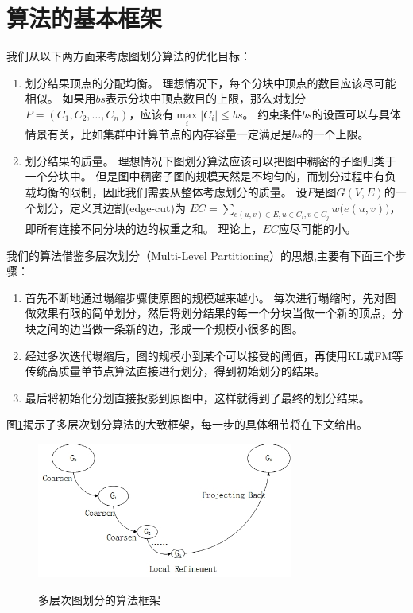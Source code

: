 \documentclass[master]{njuthesis}
\begin{document}
\section{算法的基本框架}
我们从以下两方面来考虑图划分算法的优化目标：
\begin{enumerate}
 \item 划分结果顶点的分配均衡。 理想情况下，每个分块中顶点的数目应该尽可能相似。 
 如果用$bs$表示分块中顶点数目的上限，那么对划分$P=(C_1, C_2, \dots, C_n)$，应该有$\max\limits_{i}|C_i| \leq bs$。
约束条件$bs$的设置可以与具体情景有关，比如集群中计算节点的内存容量一定满足是$bs$的一个上限。
 \item 划分结果的质量。 理想情况下图划分算法应该可以把图中稠密的子图归类于一个分块中。
 但是图中稠密子图的规模天然是不均匀的，而划分过程中有负载均衡的限制，因此我们需要从整体考虑划分的质量。
 设$P$是图$G(V,E)$的一个划分，定义其边割(edge-cut)为
 $EC =\sum\nolimits_{e(u,v) \in E, u \in C_i, v \in C_j} w\big(e(u,v)\big)$，即所有连接不同分块的边的权重之和。
 理论上，$EC$应尽可能的小。
\end{enumerate}
我们的算法借鉴多层次划分（Multi-Level Partitioning）的思想,主要有下面三个步骤：
\begin{enumerate}
 \item 首先不断地通过塌缩步骤使原图的规模越来越小。
每次进行塌缩时，先对图做效果有限的简单划分，然后将划分结果的每一个分块当做一个新的顶点，分块之间的边当做一条新的边，形成一个规模小很多的图。
\item 经过多次迭代塌缩后，图的规模小到某个可以接受的阈值，再使用KL或FM等传统高质量单节点算法直接进行划分，得到初始划分的结果。
\item 最后将初始化分划直接投影到原图中，这样就得到了最终的划分结果。
\end{enumerate}
图\ref{fig:mlp_framework}揭示了多层次划分算法的大致框架，每一步的具体细节将在下文给出。

\begin{figure}[th]
  \centering
  \includegraphics[width= 0.75\textwidth]{figure/coarsen.jpg}\\
  \caption{多层次图划分的算法框架}
   \label{fig:mlp_framework}
\end{figure}
\end{document}

